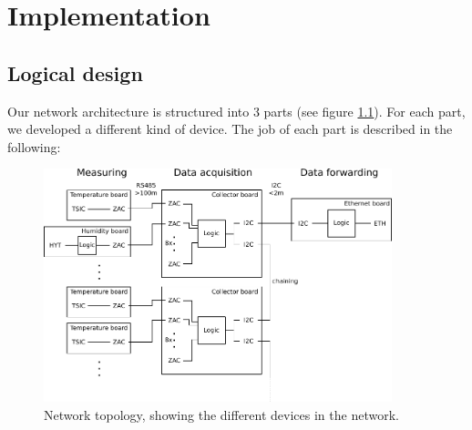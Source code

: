 \documentclass[a4paper]{scrreprt}
\begin{document}
\chapter{Implementation}
\section{Logical design}
Our network architecture is structured into 3 parts (see figure \ref{fig:topo}).
For each part, we developed a different kind of device. The job of each part
is described in the following:
\begin{figure}[Hh!]
	\centering
	\includegraphics[width=0.9\textwidth]{img/plan2.pdf}
	\caption{Network topology, showing the different devices in the network.}
	\label{fig:topo}
\end{figure}
\end{document}
